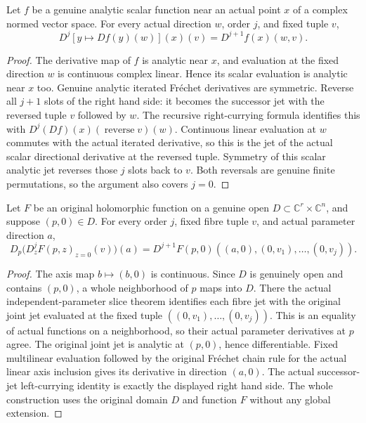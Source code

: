 \begin{theorem}
\label{hir:actual-analytic-directional-jet-commutation}
\leanok
Let $f$ be a genuine analytic scalar function near an actual point $x$
of a complex normed vector space. For every actual direction $w$, order
$j$, and fixed tuple $v$,
\[
 D^j[y\mapsto Df(y)(w)](x)(v)=D^{j+1}f(x)(w,v).
\]
\end{theorem}
\begin{proof}
The derivative map of $f$ is analytic near $x$, and evaluation at the
fixed direction $w$ is continuous complex linear. Hence its scalar
evaluation is analytic near $x$ too. Genuine analytic iterated
Fr\'echet derivatives are symmetric. Reverse all $j+1$ slots of the
right hand side: it becomes the successor jet with the reversed tuple
$v$ followed by $w$. The recursive right-currying formula identifies
this with $D^j(Df)(x)(\operatorname{reverse}v)(w)$. Continuous linear
evaluation at $w$ commutes with the actual iterated derivative, so this
is the jet of the actual scalar directional derivative at the reversed
tuple. Symmetry of this scalar analytic jet reverses those $j$ slots
back to $v$. Both reversals are genuine finite permutations, so the
argument also covers $j=0$.
\end{proof}

\begin{theorem}
\label{hir:actual-joint-parameter-fibre-jet-connection}
\leanok
Let $F$ be an original holomorphic function on a genuine open
$D\subset\mathbb C^r\times\mathbb C^n$, and suppose $(p,0)\in D$.
For every order $j$, fixed fibre tuple $v$, and actual parameter
direction $a$,
\[
 D_p\bigl(D_z^jF(p,z)_{z=0}(v)\bigr)(a)
 =D^{j+1}F(p,0)((a,0),(0,v_1),\ldots,(0,v_j)).
\]
\end{theorem}
\begin{proof}
The axis map $b\mapsto(b,0)$ is continuous. Since $D$ is genuinely
open and contains $(p,0)$, a whole neighborhood of $p$ maps into $D$.
There the actual independent-parameter slice theorem identifies each
fibre jet with the original joint jet evaluated at the fixed tuple
$((0,v_1),\ldots,(0,v_j))$. This is an equality of actual functions
on a neighborhood, so their actual parameter derivatives at $p$ agree.
The original joint jet is analytic at $(p,0)$, hence differentiable.
Fixed multilinear evaluation followed by the original Fr\'echet chain
rule for the actual linear axis inclusion gives its derivative in
direction $(a,0)$. The actual successor-jet left-currying identity is
exactly the displayed right hand side. The whole construction uses the
original domain $D$ and function $F$ without any global extension.
\end{proof}


